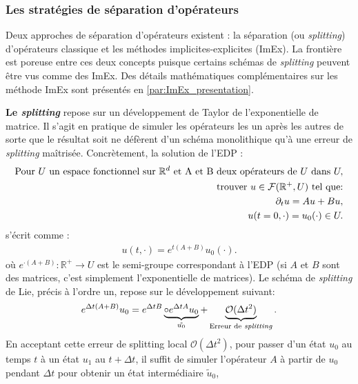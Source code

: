     \subsubsection{Les stratégies de séparation d'opérateurs}
        Deux approches de séparation d'opérateurs existent : la séparation (ou \textit{splitting}) d'opérateurs classique et les méthodes implicites-explicites (ImEx).
        La frontière est poreuse entre ces deux concepts puisque certains schémas de \textit{splitting} peuvent être vus comme des ImEx. 
        Des détails mathématiques complémentaires sur les méthode ImEx sont présentés en \ref{par:ImEx_presentation}.\par
        \textbf{Le \textit{splitting}} repose sur un développement de Taylor de l'exponentielle de matrice.
        Il s'agit en pratique de simuler les opérateurs les un après les autres de sorte que le résultat soit ne défèrent d'un schéma monolithique
        qu'à une erreur de \textit{splitting} maîtrisée.
        Concrètement, la solution de l'EDP :
        \begin{align}
            \notag\text{Pour } U \text{ un espace fonctionnel sur }\mathbb R^d \text{ et A et B deux opérateurs de } U \text{ dans } U,\\\notag 
            \text{trouver }u \in \mathcal F (\mathbb R^+,U) \text{ tel que:}\\
            \partial_t u = Au + Bu,\\
            u(t=0,\cdot) = u_0(\cdot) \in U.
        \end{align}            
        s'écrit comme :
        \begin{align}
            u(t,\cdot) = e^{t(A+B)}u_0(\cdot).
        \end{align}
        où $e^{\cdot(A+B)} : \mathbb R^+ \rightarrow U$ est le semi-groupe correspondant à l'EDP (si $A$ et $B$ sont des matrices, c'est simplement l'exponentielle de matrices).
        Le schéma de \textit{splitting} de Lie, précis à l'ordre un, repose sur le développement suivant:
        \begin{align}
            e^{\Delta t(A+B)}u_0 = e^{\Delta tB} \underbrace{\circ e^{\Delta tA}u_0}_{\tilde{u_0}} + \underbrace{\mathcal O (\Delta t^2)}_{\text{Erreur de \textit{splitting}}}.
        \end{align}
        En acceptant cette erreur de splitting local $ \mathcal O (\Delta t^2)$, pour passer d'un état $u_0$ au temps $t$ à un état $u_1$ au $t+\Delta t$, 
        il suffit de simuler l'opérateur $A$ à partir de $u_0$ pendant $\Delta t$ pour obtenir un état intermédiaire $\tilde{u}_0$,
